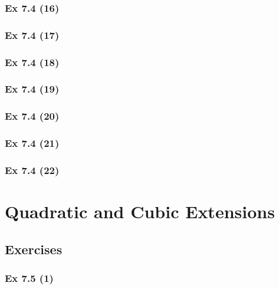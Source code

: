 \subsubsection{Ex 7.4 (16)}\label{sec:Ex_7.4.16}

\subsubsection{Ex 7.4 (17)}\label{sec:Ex_7.4.17}

\subsubsection{Ex 7.4 (18)}\label{sec:Ex_7.4.18}

\subsubsection{Ex 7.4 (19)}\label{sec:Ex_7.4.19}

\subsubsection{Ex 7.4 (20)}\label{sec:Ex_7.4.20}

\newpage		%

\subsubsection{Ex 7.4 (21)}\label{sec:Ex_7.4.21}

\subsubsection{Ex 7.4 (22)}\label{sec:Ex_7.4.22}

\newpage		%

\section{Quadratic and Cubic Extensions}\label{sec:7.5}
\subsection{Exercises}\label{sec:7.5_Exercises}

\subsubsection{Ex 7.5 (1)}\label{sec:Ex_7.5.1}

